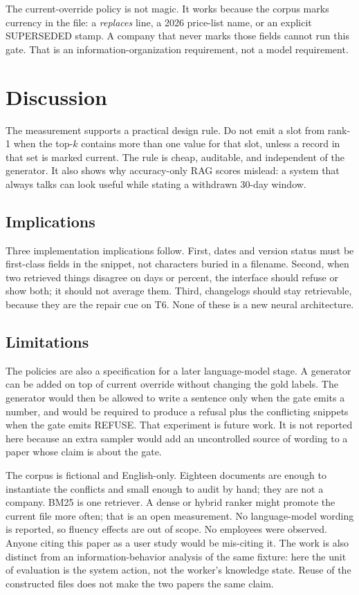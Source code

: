 \documentclass{icaiit2027}
\begin{document}
The current-override policy is not magic. It works because the corpus marks currency in the file: a \emph{replaces} line, a 2026 price-list name, or an explicit SUPERSEDED stamp. A company that never marks those fields cannot run this gate. That is an information-organization requirement, not a model requirement.

\section{Discussion}

The measurement supports a practical design rule. Do not emit a slot from rank-1 when the top-$k$ contains more than one value for that slot, unless a record in that set is marked current. The rule is cheap, auditable, and independent of the generator. It also shows why accuracy-only RAG scores mislead: a system that always talks can look useful while stating a withdrawn 30-day window.

\subsection{Implications}

Three implementation implications follow. First, dates and version status must be first-class fields in the snippet, not characters buried in a filename. Second, when two retrieved things disagree on days or percent, the interface should refuse or show both; it should not average them. Third, changelogs should stay retrievable, because they are the repair cue on T6. None of these is a new neural architecture.

\subsection{Limitations}

The policies are also a specification for a later language-model stage. A generator can be added on top of current override without changing the gold labels. The generator would then be allowed to write a sentence only when the gate emits a number, and would be required to produce a refusal plus the conflicting snippets when the gate emits REFUSE. That experiment is future work. It is not reported here because an extra sampler would add an uncontrolled source of wording to a paper whose claim is about the gate.

The corpus is fictional and English-only. Eighteen documents are enough to instantiate the conflicts and small enough to audit by hand; they are not a company. BM25 is one retriever. A dense or hybrid ranker might promote the current file more often; that is an open measurement. No language-model wording is reported, so fluency effects are out of scope. No employees were observed. Anyone citing this paper as a user study would be mis-citing it. The work is also distinct from an information-behavior analysis of the same fixture: here the unit of evaluation is the system action, not the worker's knowledge state. Reuse of the constructed files does not make the two papers the same claim.
\end{document}
